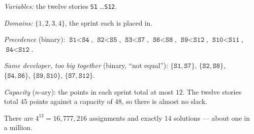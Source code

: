 \begin{examplebox}
\begin{tight}
  \item \emph{Variables:} the twelve stories \texttt{S1} \ldots \texttt{S12}.
  \item \emph{Domains:} $\{1,2,3,4\}$, the sprint each is placed in.
  \item \emph{Precedence} (binary): $\texttt{S1} < \texttt{S4}$,
        $\texttt{S2} < \texttt{S5}$, $\texttt{S3} < \texttt{S7}$,
        $\texttt{S6} < \texttt{S8}$, $\texttt{S9} < \texttt{S12}$,
        $\texttt{S10} < \texttt{S11}$, $\texttt{S4} < \texttt{S12}$.
  \item \emph{Same developer, too big together} (binary, ``not equal''):
        $\{\texttt{S1},\texttt{S7}\}$, $\{\texttt{S2},\texttt{S8}\}$,
        $\{\texttt{S4},\texttt{S6}\}$, $\{\texttt{S9},\texttt{S10}\}$,
        $\{\texttt{S7},\texttt{S12}\}$.
  \item \emph{Capacity} ($n$-ary): the points in each sprint total at most $12$.
        The twelve stories total $45$ points against a capacity of $48$, so there
        is almost no slack.
\end{tight}
There are $4^{12} = 16{,}777{,}216$ assignments and exactly $14$ solutions ---
about one in a million.
\end{examplebox}

